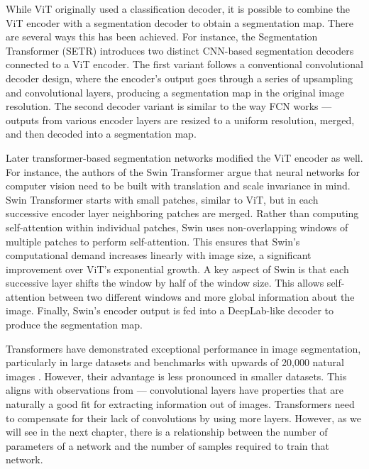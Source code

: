  While ViT originally used a classification decoder, it is possible to combine the ViT encoder with a segmentation decoder to obtain a segmentation map. There are several ways this has been achieved. For instance, the Segmentation Transformer (SETR) \cite{SETR} introduces two distinct CNN-based segmentation decoders connected to a ViT encoder. The first variant follows a conventional convolutional decoder design, where the encoder's output goes through a series of upsampling and convolutional layers, producing a segmentation map in the original image resolution. The second decoder variant is similar to the way FCN works --- outputs from various encoder layers are resized to a uniform resolution, merged, and then decoded into a segmentation map.

 Later transformer-based segmentation networks modified the ViT encoder as well. For instance, the authors of the Swin Transformer \cite{liu2021Swin} argue that neural networks for computer vision need to be built with translation and scale invariance in mind. Swin Transformer starts with small patches, similar to ViT, but in each successive encoder layer neighboring patches are merged. Rather than computing self-attention within individual patches, Swin uses non-overlapping windows of multiple patches to perform self-attention. This ensures that Swin’s computational demand increases linearly with image size, a significant improvement over ViT’s exponential growth. A key aspect of Swin is that each successive layer shifts the window by half of the window size. This allows self-attention between two different windows and more global information about the image. Finally, Swin's encoder output is fed into a DeepLab-like decoder to produce the segmentation map.
 
 Transformers have demonstrated exceptional performance in image segmentation, particularly in large datasets and benchmarks with upwards of 20,000 natural images \cite{liu2021Swin, SETR, chen2022vitadapter}. However, their advantage is less pronounced in smaller datasets. This aligns with observations from \cite{attnAllYouNeed} --- convolutional layers have properties that are naturally a good fit for extracting information out of images. Transformers need to compensate for their lack of convolutions by using more layers. However, as we will see in the next chapter, there is a relationship between the number of parameters of a network and the number of samples required to train that network.

